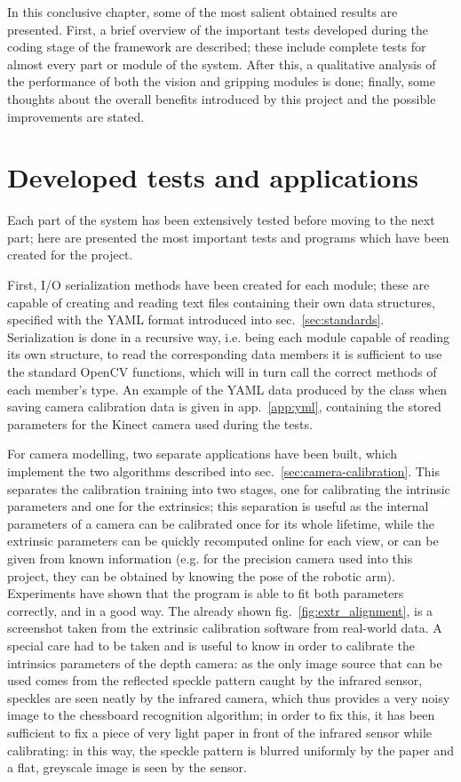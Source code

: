 In this conclusive chapter, some of the most salient obtained results
are presented. First, a brief overview of the important tests
developed during the coding stage of the framework are described;
these include complete tests for almost every part or module of the
system. After this, a qualitative analysis of the performance of both
the vision and gripping modules is done; finally, some thoughts about
the overall benefits introduced by this project and the possible
improvements are stated. 

\section{Developed tests and applications}
Each part of the system has been extensively tested before moving to
the next part; here are presented the most important tests and
programs which have been created for the project. 

First, I/O serialization methods have been created for each module;
these are capable of creating and reading text files containing their
own data structures, specified with the YAML format introduced into
sec.~\ref{sec:standards}. Serialization is done in a recursive way, i.e. being
each module capable of reading its own structure, to read the
corresponding data members it is sufficient to use the standard OpenCV
functions, which will in turn call the correct methods of each
member's type. An example of the YAML data produced by
the  class when saving camera calibration data is given in
app.~\ref{app:yml}, containing the stored parameters for the Kinect
camera used during the tests. 

For camera modelling, two separate applications have been built, which
implement the two algorithms described into
sec.~\ref{sec:camera-calibration}. This separates the calibration
training into two stages, one for calibrating the intrinsic parameters
and one for the extrinsics; this separation is useful as the internal
parameters of a camera can be calibrated once for its whole lifetime,
while the  extrinsic parameters can be quickly recomputed online for
each view, or can be given from known information (e.g. for the
precision camera used into this project, they can be obtained by
knowing the pose of the robotic arm). Experiments have shown that the
program is able to fit both parameters correctly, and in a good
way. The already shown fig.~\ref{fig:extr_alignment}, is a screenshot
taken from the extrinsic calibration software from real-world data. A
special care had to be taken and is useful to know in order to
calibrate the intrinsics parameters of the depth camera: as the only
image source that can be used comes from the reflected speckle pattern
caught by the infrared sensor, speckles are seen neatly by the
infrared camera, which thus provides a very noisy image to the
chessboard recognition algorithm; in order to fix this, it has been
sufficient to fix a piece of very light paper in front of the infrared
sensor while calibrating: in this way, the speckle pattern is blurred
uniformly by the paper and a flat, greyscale image is seen by the sensor.

